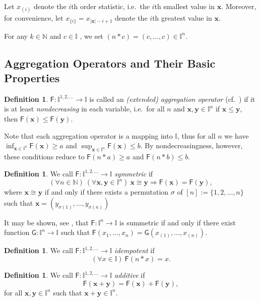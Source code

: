 \documentclass[11pt]{article}\usepackage{graphicx, color}
\renewcommand{\emph}[1]{\textsl{#1}}
\newcommand{\vect}[1]{{\mathbf{#1}}}
\newcommand{\func}[1]{{\mathsf{#1}}}
\newcommand{\Ival}{\mathbb{I}}
\newcommand{\IvalPow}[1]{\mathbb{I}^{#1}}
\newcommand{\AnyPow}{^{1,2,\dots}}
\newcommand{\IvalAnyPow}{\mathbb{I}\AnyPow}
\theoremstyle{remark}
\theoremstyle{definition}
\newtheorem{definition}[theorem]{Definition}
\begin{document}
Let $x_{(i)}$ denote the $i$th order statistic,
i.e.~the $i$th smallest value in $\vect{x}$.
Moreover, for convenience,
let $x_{\{i\}}=x_{|\vect{x}|-i+1}$ denote the $i$th greatest value in $\vect{x}$.

For any $k\in\mathbb{N}$ and $c\in\Ival$ , we set $(n\ast c) = (c,\dots,c)\in\IvalPow{n}$.



\subsection{Aggregation Operators and Their Basic Properties}

\begin{definition}
$\func{F}: \IvalAnyPow\to\Ival$ is called an \emph{(extended) aggregation operator}
(cf.~\cite{GrabischETAL2009:aggregationfunctions})
if it is at least \emph{nondecreasing} in each variable,
i.e.~for all $n$ and $\vect{x},\vect{y}\in\IvalPow{n}$
if $\vect{x}\le\vect{y}$, then $\func{F}(\vect{x})\le\func{F}(\vect{y})$.
\end{definition}

Note that each aggregation operator is a mapping into $\Ival$,
thus for all $n$ we have $\inf_{\vect{x}\in\IvalPow{n}} \func{F}(\vect{x}) \ge a$
and $\sup_{\vect{x}\in\IvalPow{n}} \func{F}(\vect{x}) \le b$.
By nondecreasingness, however, these conditions reduce to
$\func{F}(n\ast a)\ge a$ and $\func{F}(n\ast b)\le b$.

\begin{definition}
We call $\func{F}: \IvalAnyPow\to\Ival$ \emph{symmetric} if \[
(\forall n\in\mathbb{N})\ (\forall \vect{x},\vect{y}\in\IvalPow{n})\
\vect{x}\cong\vect{y}\Longrightarrow\func{F}(\vect{x})=\func{F}(\vect{y}),
 \] where  $\vect{x}\cong\vect{y}$ if and only if there exists a permutation
$\sigma$ of $[n]:=\{1,2,\dots,n\}$ such that
$\vect{x}=(y_{\sigma(1)},\dots,y_{\sigma(n)})$
\end{definition}
\medskip
It may be shown, see \cite{GrabischETAL2009:aggregationfunctions}, that 
$\func{F}:\IvalPow{n}\to\Ival$ is summetric if and only if there exist 
function $\func{G}:\IvalPow{n}\to\Ival$ such that 
$\func{F}(x_{1},\dots,x_{n})=\func{G}(x_{(1)},\dots,x_{(n)})$.
\bigskip
\begin{definition}
We call $\func{F}: \IvalAnyPow\to\Ival$ \emph{idempotent} if 
\[(\forall x\in\Ival)\ \func{F}(n\ast x)=x.\]
\end{definition}

\begin{definition}
We call $\func{F}: \IvalAnyPow\to\Ival$ \emph{additive} if \[
\func{F}(\vect{x}+\vect{y})=\func{F}(\vect{x})+\func{F}(\vect{y}),
\]
for all $\vect{x},\vect{y}\in\IvalPow{n}$ such that 
$\vect{x}+\vect{y}\in\IvalPow{n}$.
\end{definition}
\end{document}
